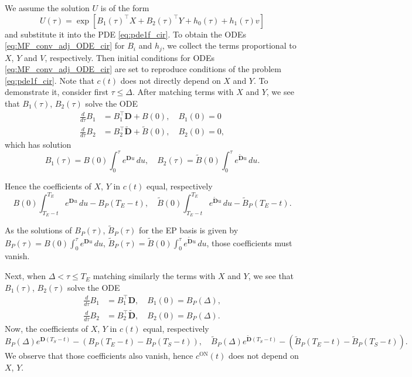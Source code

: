 \documentclass[pdftex,11pt,a4paper] {article}
\begin{document}
We assume the solution $U$ is of the form 
\begin{equation}\label{eq:U_aff_exp_cir}
U(\tau)=\exp\left[B_1(\tau)^\top X+B_2(\tau)^\top Y+h_0(\tau)+h_1(\tau)v \right]
\end{equation}
and substitute it into the PDE \eqref{eq:pde1f_cir}. 
To obtain the ODEs \eqref{eq:MF_conv_adj_ODE_cir} for $B_i$ and $h_j$, we collect the terms proportional to $X$, $Y$ and $V$, respectively. Then initial conditions for ODEs \eqref{eq:MF_conv_adj_ODE_cir} are set to reproduce conditions of the problem \eqref{eq:pde1f_cir}. 
Note that $c(t)$ does not directly depend on $X$ and $Y$. To demonstrate it, consider first $\tau\le \Delta$. After matching terms with $X$ and $Y$, we see that $B_1(\tau)$, $B_2(\tau)$ solve the ODE
\begin{equation*}
\begin{split}
\frac{d}{d\tau}B_1&=B_1^\top \mathbf{D}+B(0),\quad B_1(0)=0\\
\frac{d}{d\tau}B_2&=B_2^\top \tilde{\mathbf{D}}+\tilde B(0),\quad B_2(0)=0,
\end{split}
\end{equation*}
which has solution
\begin{equation*}
B_1(\tau)=B(0)\int_0^\tau e^{\mathbf{D}u}\,du,\quad B_2(\tau)=\tilde B(0)\int_0^\tau e^{\tilde{\mathbf{D}}u}\,du.
\end{equation*}

Hence the coefficients of $X$, $Y$ in $c(t)$ equal, respectively
\begin{equation*}
B(0)\int_{{T_E}-t}^{T_E}e^{\mathbf{D}u}\,du-B_P(T_E-t),\quad 
\tilde B(0)\int_{{T_E}-t}^{T_E}e^{\mathbf{\tilde D}u}\,du-\tilde B_P(T_E-t).
\end{equation*}


As the solutions of $B_P(\tau)$, $\tilde B_P(\tau)$ for the EP basis is given by $B_P(\tau)=B(0)\int_0^\tau e^{\mathbf{D}u}\,du$, $\tilde B_P(\tau)=\tilde B(0)\int_0^\tau e^{\tilde {\mathbf{D}}u}\,du$, those coefficients must vanish.

Next, when $\Delta<\tau\le T_E$ matching similarly the terms with $X$ and $Y$, we see that $B_1(\tau)$, $B_2(\tau)$ solve the ODE
\begin{equation*}
\begin{split}
\frac{d}{d\tau}B_1&=B_1^\top \mathbf{D},\quad B_1(0)=B_P(\Delta),\\
\frac{d}{d\tau}B_2&=B_2^\top \tilde{\mathbf{D}},\quad B_2(0)=B_P(\Delta).
\end{split}
\end{equation*}
Now, the coefficients of $X$, $Y$ in $c(t)$ equal, respectively
\begin{equation*}
B_P(\Delta)e^{\mathbf{D}(T_S-t)}-\left(B_P(T_E-t)-B_P(T_S-t)\right),\quad
\tilde B_P(\Delta)e^{\tilde {\mathbf{D}}(T_S-t)}-\left(\tilde B_P(T_E-t)-\tilde B_P(T_S-t)\right).
\end{equation*}
We observe that those coefficients also vanish, hence $c^{\mathrm{ON}}(t)$ does not depend on $X$, $Y$. 
\end{document}
